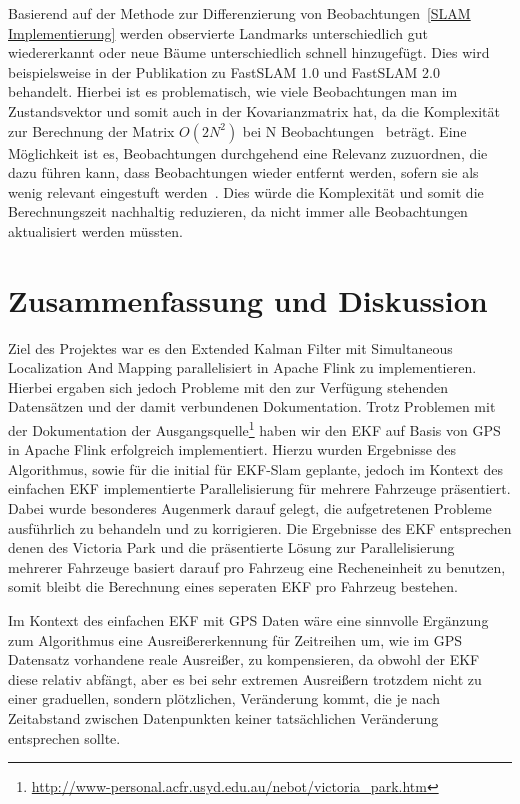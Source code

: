 \documentclass[11pt]{article}
\begin{document}
Basierend auf der Methode zur Differenzierung von Beobachtungen~\ref{SLAM Implementierung} werden observierte Landmarks unterschiedlich gut wiedererkannt oder neue Bäume unterschiedlich schnell hinzugefügt. Dies wird beispielsweise in der Publikation zu FastSLAM 1.0 und FastSLAM 2.0~\cite{thrun_fastslam_nodate} behandelt. Hierbei ist es problematisch, wie viele Beobachtungen man im Zustandsvektor und somit auch in der Kovarianzmatrix hat, da die Komplexität zur Berechnung der Matrix $O(2N^2)$ bei N Beobachtungen~\cite{ute_SLAM} beträgt. Eine Möglichkeit ist es, Beobachtungen durchgehend eine Relevanz zuzuordnen, die dazu führen kann, dass Beobachtungen wieder entfernt werden, sofern sie als wenig relevant eingestuft werden~\cite{thrun_fastslam_nodate}. Dies würde die Komplexität und somit die Berechnungszeit nachhaltig reduzieren, da nicht immer alle Beobachtungen aktualisiert werden müssten.

\section{Zusammenfassung und Diskussion}\label{Zusammenfassung und Diskussion}
Ziel des Projektes war es den Extended Kalman Filter mit Simultaneous Localization And Mapping parallelisiert in Apache Flink zu implementieren. Hierbei ergaben sich jedoch Probleme mit den zur Verfügung stehenden Datensätzen und der damit verbundenen Dokumentation.
Trotz Problemen mit der Dokumentation der Ausgangsquelle\footnote{\url{http://www-personal.acfr.usyd.edu.au/nebot/victoria_park.htm}} haben wir den EKF auf Basis von GPS in Apache Flink erfolgreich implementiert. Hierzu wurden Ergebnisse des Algorithmus, sowie für die initial für EKF-Slam geplante, jedoch im Kontext des einfachen EKF implementierte Parallelisierung für mehrere Fahrzeuge präsentiert. Dabei wurde besonderes Augenmerk darauf gelegt, die aufgetretenen Probleme ausführlich zu behandeln und zu korrigieren. Die Ergebnisse des EKF entsprechen denen des Victoria Park und die präsentierte Lösung zur Parallelisierung mehrerer Fahrzeuge basiert darauf pro Fahrzeug eine Recheneinheit zu benutzen, somit bleibt die Berechnung eines seperaten EKF pro Fahrzeug bestehen. 

Im Kontext des einfachen EKF mit GPS Daten wäre eine sinnvolle Ergänzung zum Algorithmus eine Ausreißererkennung für Zeitreihen um, wie im GPS Datensatz vorhandene reale Ausreißer, zu kompensieren, da obwohl der EKF diese relativ abfängt, aber es bei sehr extremen Ausreißern trotzdem nicht zu einer graduellen, sondern plötzlichen, Veränderung kommt, die je nach Zeitabstand zwischen Datenpunkten keiner tatsächlichen Veränderung entsprechen sollte.
\end{document}

